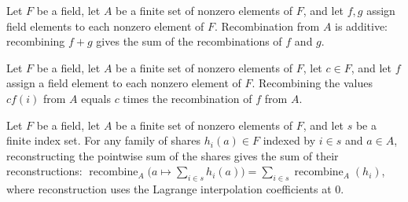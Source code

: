 \begin{theorem}
\label{TCSlib.Shamir.recombine_add}
\leanok
{}
Let $F$ be a field, let $A$ be a finite set of nonzero elements of $F$, and let $f,g$
assign field elements to each nonzero element of $F$. Recombination from $A$ is
additive: recombining $f+g$ gives the sum of the recombinations of $f$ and $g$.
\end{theorem}

\begin{theorem}
\label{TCSlib.Shamir.recombine_smul}
\leanok
{}
Let $F$ be a field, let $A$ be a finite set of nonzero elements of $F$, let $c\in F$,
and let $f$ assign a field element to each nonzero element of $F$. Recombining the
values $c f(i)$ from $A$ equals $c$ times the recombination of $f$ from $A$.
\end{theorem}

\begin{theorem}
\label{TCSlib.Shamir.recombine_sum}
\leanok
{}
Let $F$ be a field, let $A$ be a finite set of nonzero elements of $F$, and let $s$ be a
finite index set. For any family of shares $h_i(a)\in F$ indexed by $i\in s$ and $a\in
A$, reconstructing the pointwise sum of the shares gives the sum of their
reconstructions: $\operatorname{recombine}_A\bigl(a\mapsto\sum_{i\in
s}h_i(a)\bigr)=\sum_{i\in s}\operatorname{recombine}_A(h_i)$, where reconstruction uses
the Lagrange interpolation coefficients at $0$.
\end{theorem}

